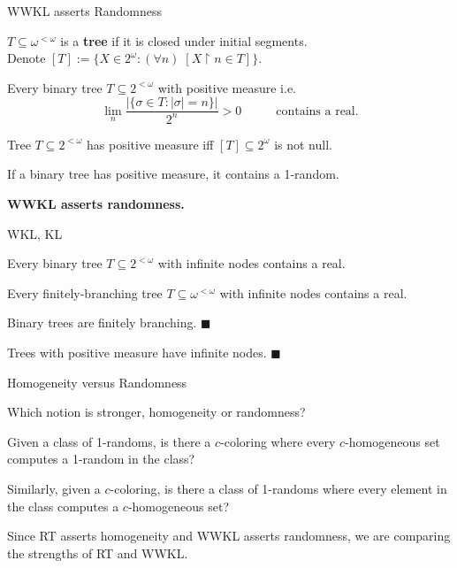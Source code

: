 \begin{frame}{WWKL asserts Randomness}
  \begin{notation*}
    $T\subseteq\omega^{<\omega}$ is a \textbf{tree} if it is closed under
    initial segments.\\
    Denote $[T]:= \{X\in2^\omega: (\forall n)\; [X\restriction n \in T]\}$.
  \end{notation*}
  \begin{thm*}
    Every binary tree $T\subseteq 2^{<\omega}$ with positive measure i.e.
    \[\lim_n \frac{|\{\sigma\in T: |\sigma|=n\}|}{2^n}
    >0\;\;\;\;\;\;\;\;\;\;
    \text{contains a real.}\]
  \end{thm*}
  \begin{fact}
    Tree $T\subseteq2^{<\omega}$ has positive measure iff
    $[T]\subseteq2^\omega$ is not null.
  \end{fact}
  \begin{coro}
    If a binary tree has positive measure, it contains a 1-random.
  \end{coro}

  \textbf{WWKL asserts randomness.}
\end{frame}

\begin{frame}{WKL, KL}
  \begin{thm*}
    Every binary tree $T\subseteq2^{<\omega}$ with infinite nodes contains
    a real.
  \end{thm*}

  \begin{thm*}
    Every finitely-branching tree $T\subseteq\omega^{<\omega}$ with
    infinite nodes contains a real.
  \end{thm*}

  \begin{observe*}
    Binary trees are finitely branching. $\blacksquare$
  \end{observe*}

  \begin{observe*}
    Trees with positive measure have infinite nodes. $\blacksquare$
  \end{observe*}
\end{frame}

\begin{frame}{Homogeneity versus Randomness}
  \begin{goal*}
    Which notion is stronger, homogeneity or randomness?
  \end{goal*}

  \vspace{2em}
  Given a class of 1-randoms, is there a $c$-coloring where every
  $c$-homogeneous set computes a 1-random in the class?

  \vspace{2em}
  Similarly, given a $c$-coloring, is there a class of 1-randoms where
  every element in the class computes a $c$-homogeneous set?

  \vspace{2em}
  Since RT asserts homogeneity and WWKL asserts randomness, we are
  comparing the strengths of RT and WWKL.
\end{frame}

